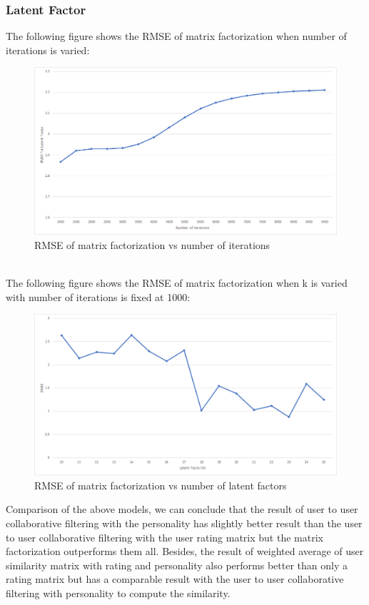 \subsubsection{Latent Factor}
The following figure shows the RMSE of matrix factorization when number of iterations is varied:
\begin{figure}[!ht]
\centering
\includegraphics[width = \textwidth ]{fig/rmse_step.png}
\caption{RMSE of matrix factorization vs number of iterations}
\label{fig:rmse_step}
\end{figure}
\\
The following figure shows the RMSE of matrix factorization when k is varied with number of iterations is fixed at 1000:
\begin{figure}[!ht]
\centering
\includegraphics[width = \textwidth ]{fig/rmse_k.png}
\caption{RMSE of matrix factorization vs number of latent factors}
\label{fig:rmse_k}
\end{figure}

Comparison of the above models, we can conclude that the result of user to user collaborative filtering with the personality has slightly better result than the user to user collaborative filtering with the user rating matrix but the matrix factorization outperforms them all. Besides, the result of weighted average of user similarity matrix with rating and personality also performs better than only a rating matrix but has a comparable result with the user to user collaborative filtering with personality to compute the similarity.
